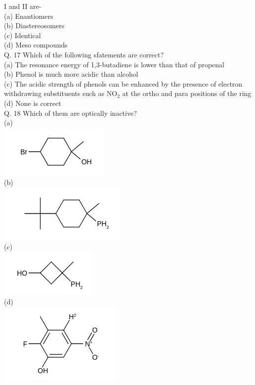 \documentclass[10pt]{article}
\begin{document}
I and II are-\\
(a) Enantiomers\\
(b) Diastereosomers\\
(c) Identical\\
(d) Meso compounds\\
Q. 17 Which of the following sfatements are correct?\\
(a) The resonance energy of 1,3-butadiene is lower than that of propenal\\
(b) Phenol is much more acidic than alcohol\\
(c) The acidic strength of phenols can be enhanced by the presence of electron withdrawing substituents such as $\mathrm{NO}_{2}$ at the ortho and para positions of the ring\\
(d) None is correct\\
Q. 18 Which of them are optically inactive?\\
(a)\\
\includegraphics{smile-b91477e5725573eac15ff5a97b54ba9cd9f4b31c}\\
(b)\\
\includegraphics{smile-53679ad2c76754b316e7665dcf6f3793dcc1991e}\\
(c)\\
\includegraphics{smile-f858d3530c32741e41cfa00470d6c198f3d3c049}\\
(d)\\
\includegraphics{smile-028cdb613ce450b889e304c8f51ec9e673d9b4fb}\\
\end{document}
